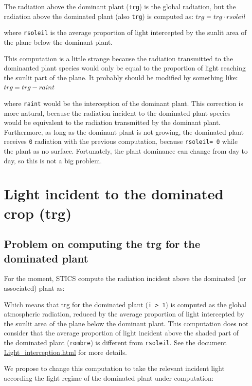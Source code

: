 \documentclass[]{book}
\theoremstyle{definition}
\theoremstyle{definition}
\theoremstyle{definition}
\theoremstyle{remark}
\begin{document}
The radiation above the dominant plant (\texttt{trg}) is the global
radiation, but the radiation above the dominated plant (also
\texttt{trg}) is computed as: \(trg=trg\cdot rsoleil\)

where \texttt{rsoleil} is the average proportion of light intercepted by
the sunlit area of the plane below the dominant plant.

This computation is a little strange because the radiation transmitted
to the dominanted plant species would only be equal to the proportion of
light reaching the sunlit part of the plane. It probably should be
modified by something like: \(trg= trg-raint\)

where \texttt{raint} would be the interception of the dominant plant.
This correction is more natural, because the radiation incident to the
dominated plant species would be equivalent to the radiation transmitted
by the dominant plant. Furthermore, as long as the dominant plant is not
growing, the dominated plant receives \texttt{0} radiation with the
previous computation, because \texttt{rsoleil=\ 0} while the plant as no
surface. Fortunately, the plant dominance can change from day to day, so
this is not a big problem.

\chapter{Light incident to the dominated crop
(trg)}\label{light-incident-to-the-dominated-crop-trg}

\section{Problem on computing the trg for the dominated
plant}\label{problem-on-computing-the-trg-for-the-dominated-plant}

For the moment, STICS compute the radiation incident above the dominated
(or associated) plant as:

Which means that trg for the dominated plant
(\texttt{i\ \textgreater{}\ 1}) is computed as the global atmospheric
radiation, reduced by the average proportion of light intercepted by the
sunlit area of the plane below the dominant plant. This computation does
not consider that the average proportion of light incident above the
shaded part of the dominated plant (\texttt{rombre}) is different from
\texttt{rsoleil}. See the document
\href{Light_Interception.html}{Light\_interception.html} for more
details.

We propose to change this computation to take the relevant incident
light according the light regime of the dominated plant under
computation:
\end{document}
